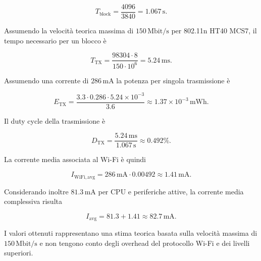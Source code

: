 \begin{equation}
	T_{\mathrm{block}} =
	\frac{4096}{3840}
	= 1.067\,\mathrm{s}.
\end{equation}

Assumendo la velocità teorica massima di \(150\,\mathrm{Mbit/s}\) per
802.11n HT40 MCS7, il tempo necessario per un blocco è

\begin{equation}
	T_{\mathrm{TX}} =
	\frac{98304\cdot8}{150\cdot10^6}
	= 5.24\,\mathrm{ms}.
\end{equation}

Assumendo una corrente di \(286\,\mathrm{mA}\) la potenza per singola trasmissione è

\begin{equation}
	E_{\mathrm{TX}}
	=
	\frac{3.3\cdot0.286\cdot5.24\times10^{-3}}{3.6}
	\approx
	\boxed{1.37\times10^{-3}\,\mathrm{mWh}}.
\end{equation}

Il duty cycle della trasmissione è

\begin{equation}
	D_{\mathrm{TX}} =
	\frac{5.24\,\mathrm{ms}}{1.067\,\mathrm{s}}
	\approx0.492\%.
\end{equation}

La corrente media associata al Wi-Fi è quindi

\begin{equation}
	I_{\mathrm{WiFi,avg}}
	=
	286\,\mathrm{mA}\cdot0.00492
	\approx1.41\,\mathrm{mA}.
\end{equation}

Considerando inoltre \(81.3\,\mathrm{mA}\) per CPU e periferiche attive, la corrente media complessiva risulta

\begin{equation}
	I_{\mathrm{avg}}
	=
	81.3+1.41
	\approx82.7\,\mathrm{mA}.
\end{equation}


I valori ottenuti rappresentano una stima teorica basata sulla velocità massima di \(150\,\mathrm{Mbit/s}\) e non tengono conto degli overhead del protocollo Wi-Fi e dei livelli superiori.


